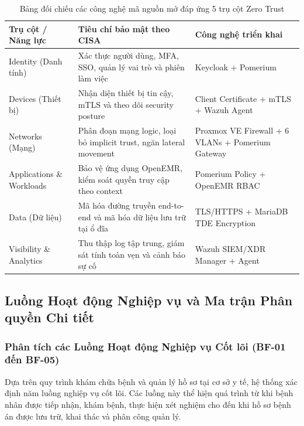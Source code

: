 \begingroup
\setlength\LTleft{0pt}
\setlength\LTright{0pt}
\begin{longtable}{| >{\raggedright\arraybackslash}p{3.2cm} | >{\raggedright\arraybackslash}p{5.5cm} | >{\raggedright\arraybackslash}p{5.5cm} |}
\caption{Bảng đối chiếu các công nghệ mã nguồn mở đáp ứng 5 trụ cột Zero Trust} \label{tab:cisa_mapping} \\
\hline
\textbf{Trụ cột / Năng lực} & \textbf{Tiêu chí bảo mật theo CISA} & \textbf{Công nghệ triển khai} \\ \hline
\endhead
\hline
\endfoot

Identity (Danh tính) & Xác thực người dùng, MFA, SSO, quản lý vai trò và phiên làm việc & Keycloak + Pomerium \\ \hline
Devices (Thiết bị) & Nhận diện thiết bị tin cậy, mTLS và theo dõi security posture & Client Certificate + mTLS + Wazuh Agent \\ \hline
Networks (Mạng) & Phân đoạn mạng logic, loại bỏ implicit trust, ngăn lateral movement & Proxmox VE Firewall + 6 VLANs + Pomerium Gateway \\ \hline
Applications \& Workloads & Bảo vệ ứng dụng OpenEMR, kiểm soát quyền truy cập theo context & Pomerium Policy + OpenEMR RBAC \\ \hline
Data (Dữ liệu) & Mã hóa đường truyền end-to-end và mã hóa dữ liệu lưu trữ tại ổ đĩa & TLS/HTTPS + MariaDB TDE Encryption \\ \hline
Visibility \& Analytics & Thu thập log tập trung, giám sát tính toàn vẹn và cảnh báo sự cố & Wazuh SIEM/XDR Manager + Agent \\ \hline
\end{longtable}
\endgroup

\subsection{Luồng Hoạt động Nghiệp vụ và Ma trận Phân quyền Chi tiết}

\subsubsection{Phân tích các Luồng Hoạt động Nghiệp vụ Cốt lõi (BF-01 đến BF-05)}

Dựa trên quy trình khám chữa bệnh và quản lý hồ sơ tại cơ sở y tế, hệ thống xác định năm luồng nghiệp vụ cốt lõi. Các luồng này thể hiện quá trình từ khi bệnh nhân được tiếp nhận, khám bệnh, thực hiện xét nghiệm cho đến khi hồ sơ bệnh án được lưu trữ, khai thác và phân công quản lý.

